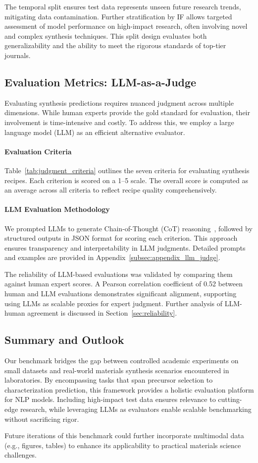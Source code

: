 The temporal split ensures test data represents unseen future research trends, mitigating data contamination. Further stratification by IF allows targeted assessment of model performance on high-impact research, often involving novel and complex synthesis techniques. This split design evaluates both generalizability and the ability to meet the rigorous standards of top-tier journals.


\subsection{Evaluation Metrics: LLM-as-a-Judge}
\label{subsec:metric}

Evaluating synthesis predictions requires nuanced judgment across multiple dimensions. While human experts provide the gold standard for evaluation, their involvement is time-intensive and costly. To address this, we employ a large language model (LLM) as an efficient alternative evaluator.


\paragraph*{Evaluation Criteria}
Table~\ref{tab:judgment_criteria} outlines the seven criteria for evaluating synthesis recipes.
Each criterion is scored on a 1–5 scale. The overall score is computed as an average across all criteria to reflect recipe quality comprehensively.

\paragraph*{LLM Evaluation Methodology}
We prompted LLMs to generate Chain-of-Thought (CoT) reasoning~\cite{wei2022chain}, followed by structured outputs in JSON format for scoring each criterion. This approach ensures transparency and interpretability in LLM judgments. Detailed prompts and examples are provided in Appendix~\ref{subsec:appendix_llm_judge}.

The reliability of LLM-based evaluations was validated by comparing them against human expert scores. A Pearson correlation coefficient of 0.52 between human and LLM evaluations demonstrates significant alignment, supporting using LLMs as scalable proxies for expert judgment. Further analysis of LLM-human agreement is discussed in Section~\ref{sec:reliability}.

\subsection{Summary and Outlook}
Our benchmark bridges the gap between controlled academic experiments on small datasets and real-world materials synthesis scenarios encountered in laboratories. By encompassing tasks that span precursor selection to characterization prediction, this framework provides a holistic evaluation platform for NLP models. Including high-impact test data ensures relevance to cutting-edge research, while leveraging LLMs as evaluators enable scalable benchmarking without sacrificing rigor.

Future iterations of this benchmark could further incorporate multimodal data (e.g., figures, tables) to enhance its applicability to practical materials science challenges.